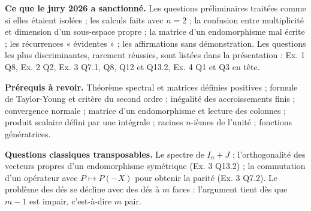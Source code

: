\documentclass[11pt,a4paper]{article}
\begin{document}
\textbf{Ce que le jury 2026 a sanctionné.} Les questions préliminaires traitées comme si elles étaient isolées ; les calculs faits avec \(n=2\) ; la confusion entre multiplicité et dimension d'un sous-espace propre ; la matrice d'un endomorphisme mal écrite ; les récurrences « évidentes » ; les affirmations sans démonstration. Les questions les plus discriminantes, rarement réussies, sont listées dans la présentation : Ex. 1 Q8, Ex. 2 Q2, Ex. 3 Q7.1, Q8, Q12 et Q13.2, Ex. 4 Q1 et Q3 en tête.

\textbf{Prérequis à revoir.} Théorème spectral et matrices définies positives ; formule de Taylor-Young et critère du second ordre ; inégalité des accroissements finis ; convergence normale ; matrice d'un endomorphisme et lecture des colonnes ; produit scalaire défini par une intégrale ; racines \(n\)-ièmes de l'unité ; fonctions génératrices.

\textbf{Questions classiques transposables.} Le spectre de \(I_n+J\) ; l'orthogonalité des vecteurs propres d'un endomorphisme symétrique (Ex. 3 Q13.2) ; la commutation d'un opérateur avec \(P\mapsto P(-X)\) pour obtenir la parité (Ex. 3 Q7.2). Le problème des dés se décline avec des dés à \(m\) faces : l'argument tient dès que \(m-1\) est impair, c'est-à-dire \(m\) pair.
\end{document}
